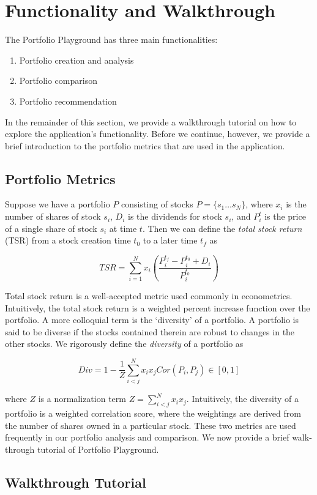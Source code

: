 \documentclass{article}
\begin{document}
\section{Functionality and Walkthrough} \label{sec:fun_walk}
The Portfolio Playground has three main functionalities:
\begin{enumerate}
	\item Portfolio creation and analysis
	\item Portfolio comparison
	\item Portfolio recommendation
\end{enumerate}
In the remainder of this section, we provide a walkthrough tutorial on how to explore the application's functionality. Before we continue, however, we provide a brief introduction to the portfolio metrics that are used in the application.

\subsection{Portfolio Metrics}
Suppose we have a portfolio $P$ consisting of stocks $P = \{s_1\dots s_N\}$, where $x_i$ is the number of shares of stock $s_i$, $D_i$ is the dividends for stock $s_i$, and $P^{t}_{i}$ is the price of a single share of stock $s_i$ at time $t$. Then we can define the \emph{total stock return} (TSR) from a stock creation time $t_0$ to a later time $t_f$ as 

$$TSR = \sum_{i=1}^N x_i \left( \frac{P^{t_f}_{i} - P^{t_0}_{i} + D_i}{P^{t_0}_{i}} \right) $$

Total stock return is a well-accepted metric used commonly in econometrics. Intuitively, the total stock return is a weighted percent increase function over the portfolio. A more colloquial term is the `diversity' of a portfolio. A portfolio is said to be diverse if the stocks contained therein are robust to changes in the other stocks. We rigorously define the \emph{diversity} of a portfolio as

$$Div = 1 - \frac{1}{Z} \sum_{i<j}^N x_i x_j Cor(P_i,P_j) \in \left[ 0,1 \right]$$

where $Z$ is a normalization term $Z = \sum_{i<j}^N x_i x_j$. Intuitively, the diversity of a portfolio is a weighted correlation score, where the weightings are derived from the number of shares owned in a particular stock. These two metrics are used frequently in our portfolio analysis and comparison. We now provide a brief walk-through tutorial of Portfolio Playground.

\subsection{Walkthrough Tutorial}
\end{document}

